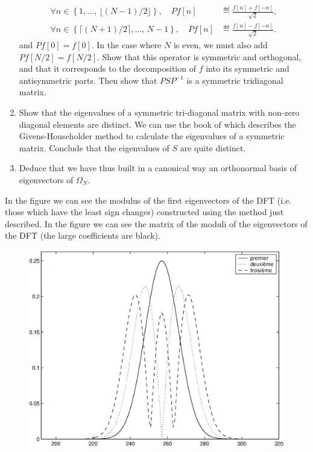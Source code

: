 \begin{exo}
\begin{enumerate}
\begin{align*}
\forall n \in \left\{1, \ldots, \, \lfloor (N-1) / 2 \rfloor \right\}, \quad P f[n] & \eqdef \frac{f[n] + f[-n]}{\sqrt{2}}, \\
\forall n \in \left\{\lceil (N + 1) / 2 \rceil, \ldots, \, N-1 \right\}, \quad P f[n] & \eqdef \frac{f[n ] - f[-n]}{\sqrt{2}}.
\end{align*}
and $ P f[0] = f[0] $. In the case where $N$ is even, we must also add $ P f[N / 2] = f[N / 2] $. Show that this operator is symmetric and orthogonal, and that it corresponds to the decomposition of $ f $ into its symmetric and antisymmetric parts. Then show that $ PSP^{-1} $ is a symmetric tridiagonal matrix.
\item {} Show that the eigenvalues of a symmetric tri-diagonal matrix with non-zero diagonal elements are distinct. We can use the book of  which describes the Givens-Householder method to calculate the eigenvalues of a symmetric matrix. Conclude that the eigenvalues of $ S $ are quite distinct.
\item Deduce that we have thus built in a canonical way an orthonormal basis of eigenvectors of $ \Omega_N $.
\end{enumerate} In the figure  we can see the modulus of the first eigenvectors of the DFT (i.e. those which have the least sign changes) constructed using the method just described. In the figure  we can see the matrix of the moduli of the eigenvectors of the DFT (the large coefficients are black). \begin{figure}[ht]
    \begin{center}
    \includegraphics [scale = 0.4]{images/vecteurs-propres-tfd.eps}

\end{center}
\end{figure}
\end{exo}
